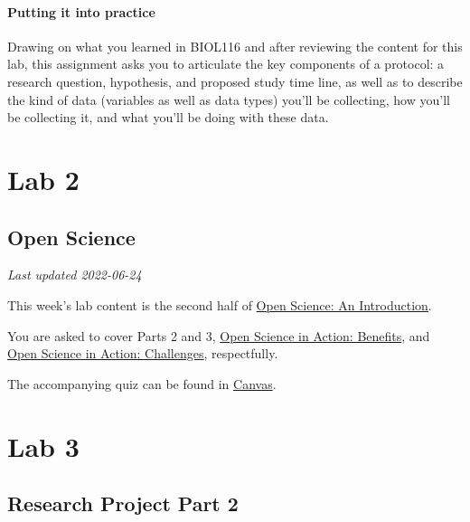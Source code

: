 \documentclass[
]{book}
\begin{document}
\hypertarget{putting-it-into-practice}{%
\subsection*{Putting it into practice}\label{putting-it-into-practice}}

Drawing on what you learned in BIOL116 and after reviewing the content for this lab, this assignment asks you to articulate the key components of a protocol: a research question, hypothesis, and proposed study time line, as well as to describe the kind of data (variables as well as data types) you'll be collecting, how you'll be collecting it, and what you'll be doing with these data.

\hypertarget{part-lab-2}{%
\part*{Lab 2}\label{part-lab-2}}

\hypertarget{open-science}{%
\chapter*{Open Science}\label{open-science}}

\emph{Last updated 2022-06-24}

This week's lab content is the second half of \href{https://ubco-biology.github.io/OS-Introduction/}{Open Science: An Introduction}.

You are asked to cover Parts 2 and 3, \href{https://ubco-biology.github.io/OS-Introduction/open-science-in-action-benefits.html}{Open Science in Action: Benefits}, and \href{https://ubco-biology.github.io/OS-Introduction/open-science-in-action-challenges.html}{Open Science in Action: Challenges}, respectfully.

The accompanying quiz can be found in \href{https://canvas.ubc.ca/courses/94573}{Canvas}.

\hypertarget{part-lab-3}{%
\part*{Lab 3}\label{part-lab-3}}

\hypertarget{research-project-part-2}{%
\chapter*{Research Project Part 2}\label{research-project-part-2}}
\end{document}
